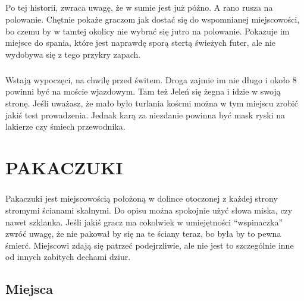 \documentclass[ms,a4paper]{memoir}
\newcommand{\RED}[1]{\textcolor{red!50!black}{\MakeUppercase{#1}}}
\begin{document}
\paragraph{}
Po tej historii, zwraca uwagę, że w sumie jest już późno.
A rano rusza na polowanie.
Chętnie pokaże graczom jak dostać się do wspomnianej miejscowości, bo czemu by w tamtej okolicy nie wybrać się jutro na polowanie.
Pokazuje im miejsce do spania, które jest naprawdę sporą stertą świeżych futer, ale nie wydobywa się z tego przykry zapach.
\paragraph{}
Wstają wypoczęci, na chwilę przed świtem.
Droga zajmie im nie długo i około 8 powinni być na moście wjazdowym.
Tam też Jeleń się żegna i idzie w swoją stronę.
Jeśli uważasz, że mało było turlania koścmi można w tym miejscu zrobić jakiś test prowadzenia.
Jednak karą za niezdanie powinna być mask ryski na lakierze czy śmiech przewodnika.


\chapter{\RED{Pakaczuki}}

\paragraph{}
Pakaczuki jest miejscowością położoną w dolince otoczonej z każdej strony stromymi ścianami skalnymi.
Do opisu można spokojnie użyć słowa miska, czy nawet szklanka.
Jeśli jakiś gracz ma cokolwiek w umiejętności ``wspinaczka'' zwróć uwagę, że nie pakował by się na te ściany teraz, bo była by to pewna śmierć.
Miejscowi zdają się patrzeć podejrzliwie, ale nie jest to szczególnie inne od innych zabitych dechami dziur.
\section{Miejsca}
\end{document}
